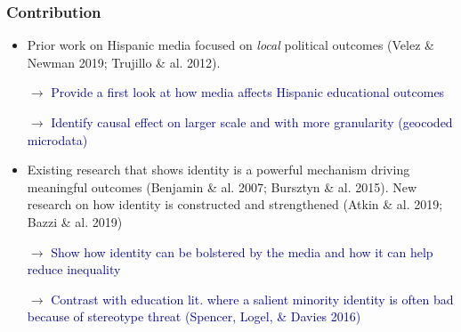 \documentclass{beamer}
\begin{document}
\begin{frame}
\frametitle{Contribution}
\begin{itemize}

\item Prior work on Hispanic media focused on \textit{local} political outcomes {\footnotesize (Velez \& Newman 2019; Trujillo \& al. 2012)}. 

\item[$\rightarrow $] \textcolor{darkblue}{Provide a first look at how media affects Hispanic educational outcomes}

\item[$\rightarrow $] \textcolor{darkblue}{Identify causal effect on larger scale and with more granularity (geocoded microdata)}

\item Existing research that shows identity is a powerful mechanism driving meaningful outcomes {\footnotesize (Benjamin \& al. 2007; Bursztyn \& al. 2015)}. New research on how identity is constructed and strengthened {\footnotesize (Atkin \& al. 2019; Bazzi \& al. 2019)}

\item[$\rightarrow $] \textcolor{darkblue}{Show how identity can be bolstered by the media and how it can help reduce inequality}

\item[$\rightarrow $] \textcolor{darkblue}{Contrast with education lit. where a salient minority identity is often bad because of stereotype threat {\footnotesize (Spencer, Logel, \& Davies 2016)}}

\end{itemize}

\end{frame}

\end{document}

